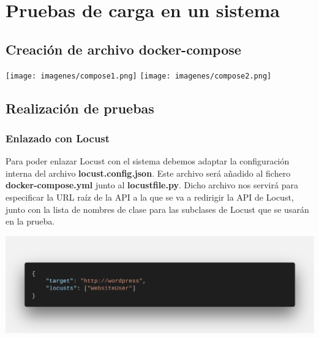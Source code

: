 \documentclass{beamer}
\theoremstyle{plain}
\theoremstyle{definition}
\theoremstyle{plain}
\theoremstyle{definition}
\theoremstyle{remark}
\theoremstyle{definition}
\begin{document}
\section{Pruebas de carga en un sistema} 

\subsection{Creación de archivo docker-compose}
\begin{frame}
	\centering
	\texttt{[image: imagenes/compose1.png]}
	\texttt{[image: imagenes/compose2.png]}
\end{frame}
\subsection{Realización de pruebas}
\begin{frame}
	\frametitle{Enlazado con Locust}
	Para poder enlazar Locust con el sistema debemos adaptar la configuración interna del archivo \textbf{locust.config.json}. Este archivo será añadido al fichero \textbf{docker-compose.yml} junto al \textbf{locustfile.py}.
	Dicho archivo nos servirá para especificar la URL raíz de la API a la que se va a redirigir la API de Locust, junto con la lista de nombres de clase para las subclases de Locust que se usarán en la prueba.

	\centering
	\includegraphics[scale=0.15]{imagenes/jsonLocust.png}
	\end{frame}
\end{document}
